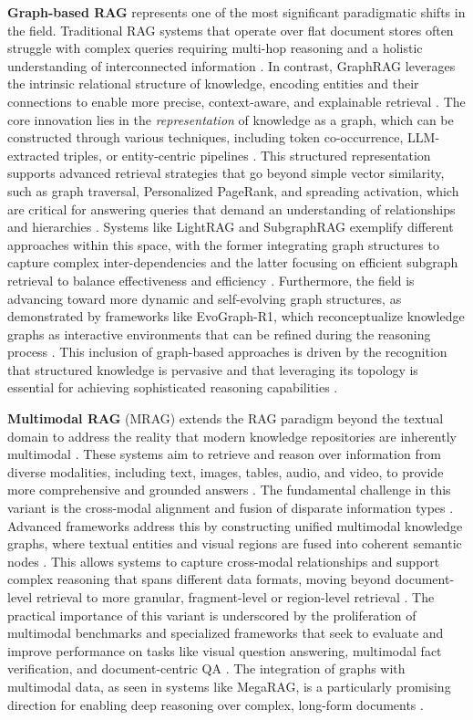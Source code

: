 \documentclass[11pt]{article}
\begin{document}
\textbf{Graph-based RAG} represents one of the most significant paradigmatic shifts in the field. Traditional RAG systems that operate over flat document stores often struggle with complex queries requiring multi-hop reasoning and a holistic understanding of interconnected information \cite{ref33,ref28,ref34}. In contrast, GraphRAG leverages the intrinsic relational structure of knowledge, encoding entities and their connections to enable more precise, context-aware, and explainable retrieval \cite{ref35,ref36,ref37}. The core innovation lies in the \emph{representation} of knowledge as a graph, which can be constructed through various techniques, including token co-occurrence, LLM-extracted triples, or entity-centric pipelines \cite{ref37}. This structured representation supports advanced retrieval strategies that go beyond simple vector similarity, such as graph traversal, Personalized PageRank, and spreading activation, which are critical for answering queries that demand an understanding of relationships and hierarchies \cite{ref37,ref38,ref39}. Systems like LightRAG and SubgraphRAG exemplify different approaches within this space, with the former integrating graph structures to capture complex inter-dependencies \cite{ref40} and the latter focusing on efficient subgraph retrieval to balance effectiveness and efficiency \cite{ref41}. Furthermore, the field is advancing toward more dynamic and self-evolving graph structures, as demonstrated by frameworks like EvoGraph-R1, which reconceptualize knowledge graphs as interactive environments that can be refined during the reasoning process \cite{ref42}. This inclusion of graph-based approaches is driven by the recognition that structured knowledge is pervasive and that leveraging its topology is essential for achieving sophisticated reasoning capabilities \cite{ref43}.

\textbf{Multimodal RAG} (MRAG) extends the RAG paradigm beyond the textual domain to address the reality that modern knowledge repositories are inherently multimodal \cite{ref44}. These systems aim to retrieve and reason over information from diverse modalities, including text, images, tables, audio, and video, to provide more comprehensive and grounded answers \cite{ref45}. The fundamental challenge in this variant is the cross-modal alignment and fusion of disparate information types \cite{ref45}. Advanced frameworks address this by constructing unified multimodal knowledge graphs, where textual entities and visual regions are fused into coherent semantic nodes \cite{ref46,ref47}. This allows systems to capture cross-modal relationships and support complex reasoning that spans different data formats, moving beyond document-level retrieval to more granular, fragment-level or region-level retrieval \cite{ref48}. The practical importance of this variant is underscored by the proliferation of multimodal benchmarks and specialized frameworks that seek to evaluate and improve performance on tasks like visual question answering, multimodal fact verification, and document-centric QA \cite{ref49,ref50}. The integration of graphs with multimodal data, as seen in systems like MegaRAG, is a particularly promising direction for enabling deep reasoning over complex, long-form documents \cite{ref51}.
\end{document}
